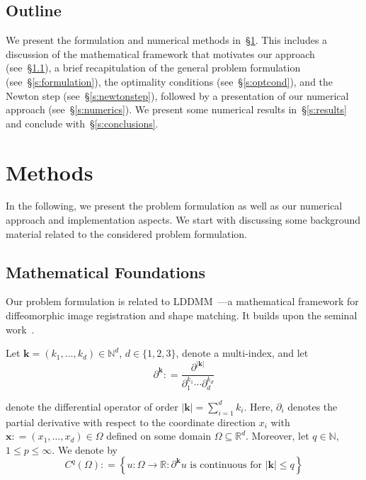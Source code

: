 \documentclass[11pt]{amsart}
\newcommand{\secref}[1]{\S\ref{#1}}
\newcommand{\defeq}{\ensuremath{\mathrel{\mathop:}=}}
\renewcommand{\vec}[1]{\ensuremath{\boldsymbol{#1}}}
\begin{document}
\subsection{Outline}

We present the formulation and numerical methods in~\secref{s:methods}. This includes a discussion of the mathematical framework that motivates our approach (see~\secref{s:background}), a brief recapitulation of the general problem formulation (see~\secref{s:formulation}), the optimality conditions (see~\secref{s:optcond}), and the Newton step (see~\secref{s:newtonstep}), followed by a presentation of our numerical approach (see~\secref{s:numerics}). We present some numerical results in~\secref{s:results} and conclude with~\secref{s:conclusions}.




\section{Methods}
\label{s:methods}

In the following, we present the problem formulation as well as our numerical approach and implementation aspects. We start with discussing some background material related to the considered problem formulation.




\subsection{Mathematical Foundations}\label{s:background}

Our problem formulation is related to LDDMM~\cite{Trouve:1998a,Trouve:1995a,Glaunes:2004a,Glaunes:2008a,Younes:2019a,Beg:2005a}---a mathematical framework for diffeomorphic image registration and shape matching. It builds upon the seminal work~\cite{Arnold:1966a,Arnold:1976a,Ebin:1970a}.

Let $\vec{k} = (k_1,\ldots,k_d) \in \mathbb{N}^d$, $d \in \{1,2,3\}$, denote a multi-index, and let
\[
\partial^{\vec{k}} \defeq \frac{\partial^{|\vec{k}|}}{\partial_1^{k_1}\cdots \partial_d^{k_d}}
\]

\noindent denote the differential operator of order $|\vec{k}| = \sum_{i=1}^d k_i$. Here, $\partial_i$ denotes the partial derivative with respect to the coordinate direction $x_i$ with $\vec{x} \defeq (x_1, \ldots, x_d) \in \Omega$ defined on some domain $\Omega \subseteq \mathbb{R}^d$. Moreover, let $q \in \mathbb{N}$, $1 \leq p \leq \infty$. We denote by
 \[
C^q(\Omega)
\defeq
\left\{u : \Omega \to \mathbb{R} : \partial^{\vec{k}} u \text{ is continuous for }|\vec{k}| \leq q \right\}
\]
\end{document}
